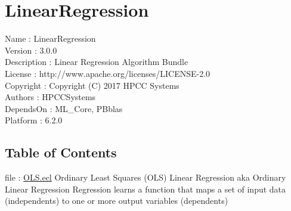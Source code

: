 \chapter*{LinearRegression}
\hypertarget{ecldoc:toc:LinearRegression}{}

Name : LinearRegression \\
Version : 3.0.0 \\
Description : Linear Regression Algorithm Bundle \\
License : http://www.apache.org/licenses/LICENSE-2.0 \\
Copyright : Copyright (C) 2017 HPCC Systems \\
Authors : HPCCSystems \\
DependsOn : ML\_Core, PBblas \\
Platform : 6.2.0 \\

\section*{Table of Contents}
file : \hyperlink{ecldoc:toc:LinearRegression.OLS}{OLS.ecl}  Ordinary Least Squares (OLS) Linear Regression aka Ordinary Linear Regression Regression learns a function that maps a set of input data (independents) to one or more output variables (dependents) \\


